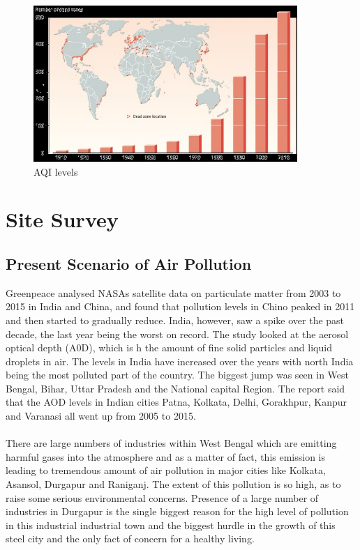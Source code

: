 \begin{figure}[h]
\centering
  \includegraphics[width=100mm]{deadzone.jpg}
  \caption{AQI levels}
  \label{fig:AQI levels}
\end{figure}


\section{Site Survey}

\subsection{Present Scenario of Air Pollution}
Greenpeace analysed NASAs satellite data on particulate matter from 2003 to 2015 in India and China, and found that pollution levels in Chino peaked in 2011 and then started to gradually reduce. India, however, saw a spike over the past decade, the last year being the worst on record. The study looked at the aerosol optical depth (A0D), which is h the amount of fine solid particles and liquid droplets in air. The levels in India have increased over the years with north India being the most polluted part of the country. The biggest jump was seen in West Bengal, Bihar, Uttar Pradesh and the National capital Region. The report said that the AOD levels in Indian cities Patna, Kolkata, Delhi, Gorakhpur, Kanpur and Varanasi all went up from 2005 to 2015.
\\
\\
 There are large numbers of industries within West Bengal which are emitting harmful gases into the atmosphere and as a matter of fact, this emission is leading to tremendous amount of air pollution in major cities like Kolkata, Asansol, Durgapur and Raniganj. The extent of this pollution is so high, as to raise some serious environmental concerns. Presence of a large number of industries in Durgapur is the single biggest reason for the high level of pollution in this industrial industrial town and the biggest hurdle in the growth of this steel city and the only fact of concern for a healthy living.

